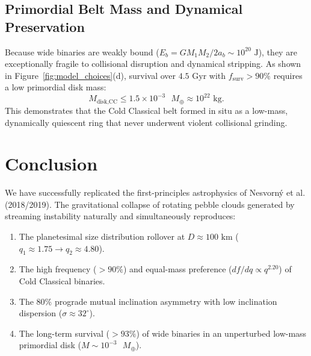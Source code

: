\documentclass[11pt,a4paper]{article}
\begin{document}
\subsection{Primordial Belt Mass and Dynamical Preservation}
Because wide binaries are weakly bound ($E_b = G M_1 M_2 / 2 a_b \sim 10^{20}\text{ J}$), they are exceptionally fragile to collisional disruption and dynamical stripping. As shown in Figure~\ref{fig:model_choices}(d), survival over $4.5\text{ Gyr}$ with $f_{\text{surv}} > 90\%$ requires a low primordial disk mass:
\begin{equation}
M_{\text{disk,CC}} \le 1.5 \times 10^{-3}\text{ }M_\oplus \approx 10^{22}\text{ kg}.
\end{equation}
This demonstrates that the Cold Classical belt formed in situ as a low-mass, dynamically quiescent ring that never underwent violent collisional grinding.

\section{Conclusion}
We have successfully replicated the first-principles astrophysics of Nesvorn\'y et al. (2018/2019). The gravitational collapse of rotating pebble clouds generated by streaming instability naturally and simultaneously reproduces:
\begin{enumerate}
    \item The planetesimal size distribution rollover at $D \approx 100\text{ km}$ ($q_1 \approx 1.75 \to q_2 \approx 4.80$).
    \item The high frequency ($>90\%$) and equal-mass preference ($df/dq \propto q^{2.20}$) of Cold Classical binaries.
    \item The $80\%$ prograde mutual inclination asymmetry with low inclination dispersion ($\sigma \approx 32^\circ$).
    \item The long-term survival ($>93\%$) of wide binaries in an unperturbed low-mass primordial disk ($M \sim 10^{-3}\text{ }M_\oplus$).
\end{enumerate}
\end{document}
